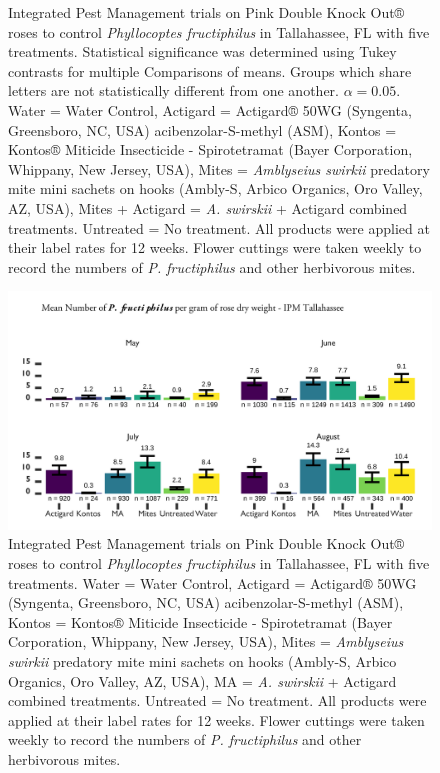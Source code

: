 \documentclass[12pt,final,CPage]{ufthesis}
\begin{document}
{\begin{figure}
{  }

  \caption{Integrated Pest Management trials on Pink Double Knock Out® roses to control \textit{Phyllocoptes fructiphilus} in Tallahassee, FL with five treatments. Statistical significance was determined using Tukey contrasts for multiple Comparisons of means. Groups which share letters are not statistically different from one another. $\alpha = 0.05$. Water = Water Control, Actigard = Actigard® 50WG (Syngenta, Greensboro, NC, USA) acibenzolar-S-methyl (ASM), Kontos = Kontos® Miticide Insecticide - Spirotetramat (Bayer Corporation, Whippany, New Jersey, USA), Mites = \textit{Amblyseius swirkii} predatory mite mini sachets on hooks (Ambly-S, Arbico Organics, Oro Valley, AZ, USA), Mites + Actigard = \textit{A. swirskii} + Actigard combined treatments. Untreated = No treatment. All products were applied at their label rates for 12 weeks. Flower cuttings were taken weekly to record the numbers of \textit{P. fructiphilus} and other herbivorous mites.}\label{fig:ipm-talla-erios}
  \end{figure}
  \begin{figure}

  {\centering \includegraphics[width=0.8\linewidth]{figure/rrv_ipm_graph_erios_talla_week} 

  }

  \caption{Integrated Pest Management trials on Pink Double Knock Out® roses to control \textit{Phyllocoptes fructiphilus} in Tallahassee, FL with five treatments. Water = Water Control, Actigard = Actigard® 50WG (Syngenta, Greensboro, NC, USA) acibenzolar-S-methyl (ASM), Kontos = Kontos® Miticide Insecticide - Spirotetramat (Bayer Corporation, Whippany, New Jersey, USA), Mites = \textit{Amblyseius swirkii} predatory mite mini sachets on hooks (Ambly-S, Arbico Organics, Oro Valley, AZ, USA), MA = \textit{A. swirskii} + Actigard combined treatments. Untreated = No treatment. All products were applied at their label rates for 12 weeks. Flower cuttings were taken weekly to record the numbers of \textit{P. fructiphilus} and other herbivorous mites.}\label{fig:ipm-talla-erios-week}
  \end{figure}
  \begin{figure}


\end{figure}}
\end{document}
